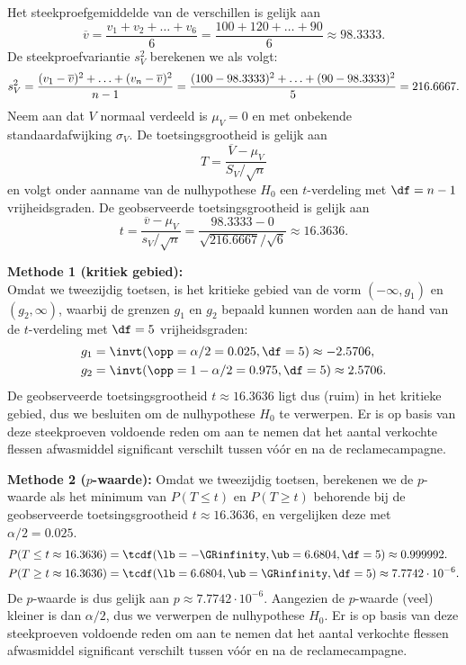 {    Het steekproefgemiddelde van de verschillen is gelijk aan
    \[
        \overline{v} = \frac{v_1 + v_2 + \ldots + v_6}{6} = \frac{100 + 120 + \ldots + 90}{6} \approx 98.3333.
    \]
    De steekproefvariantie $s_V^2$ berekenen we als volgt:
    \[
        s_V^2 = \frac{(v_1-\overline{v})^2 + \ldots + (v_n-\overline{v})^2}{n-1} = \frac{(100-98.3333)^2 + \ldots + (90-98.3333)^2}{5} = 216.6667. \\
    \]
    Neem aan dat $V$ normaal verdeeld is $\mu_V = 0$ en met onbekende standaardafwijking $\sigma_V$.
    De toetsingsgrootheid is gelijk aan
    \[
        T = \frac{\overline{V} - \mu_V}{S_V / \sqrt{n}}
    \]
    en volgt onder aanname van de nulhypothese $H_0$ een $t$-verdeling met $\df=n-1$ vrijheidsgraden.
    De geobserveerde toetsingsgrootheid is gelijk aan
    \[
        t = \frac{\overline{v} - \mu_V}{s_V / \sqrt{n}} = \frac{98.3333 - 0}{\sqrt{216.6667} / \sqrt{6}} \approx 16.3636.
    \]

    {\noindent\bfseries Methode 1 (kritiek gebied):}\\
    Omdat we tweezijdig toetsen, is het kritieke gebied van de vorm $(-\infty, g_1)$ en $(g_2, \infty)$, waarbij de grenzen $g_1$ en $g_2$ bepaald 
    kunnen worden aan de hand van de $t$-verdeling met $\df=5$ vrijheidsgraden:
    \begin{align*}
        g_1 &= \invt(\opp=\alpha/2 = 0.025, \df=5) \approx -2.5706, \\
        g_2 &= \invt(\opp=1-\alpha/2 = 0.975, \df=5) \approx 2.5706.
    \end{align*}
    De geobserveerde toetsingsgrootheid $t \approx 16.3636$ ligt dus (ruim) in het kritieke gebied, dus we besluiten om de nulhypothese $H_0$ te verwerpen.
    Er is op basis van deze steekproeven voldoende reden om aan te nemen dat het aantal verkochte flessen afwasmiddel significant verschilt tussen vóór en
    na de reclamecampagne.\\
    \medskip

    {\noindent\bfseries Methode 2 ($p$-waarde):}
    Omdat we tweezijdig toetsen, berekenen we de $p$-waarde als het minimum van $P(T \leq t)$ en $P(T \geq t)$ behorende bij de geobserveerde toetsingsgrootheid $t \approx 16.3636$, en vergelijken deze met $\alpha/2 = 0.025$.
    \begin{align*}
        P(T \leq t \approx 16.3636) &= \tcdf(\lb=-\GRinfinity, \ub=6.6804, \df=5) \approx 0.999992.\\
        P(T \geq t \approx 16.3636) &= \tcdf(\lb=6.6804, \ub=\GRinfinity, \df=5) \approx 7.7742 \cdot 10^{-6}.
    \end{align*}
    De $p$-waarde is dus gelijk aan $p \approx 7.7742 \cdot 10^{-6}$.
    Aangezien de $p$-waarde (veel) kleiner is dan $\alpha/2$, dus we verwerpen de nulhypothese $H_0$.
    Er is op basis van deze steekproeven voldoende reden om aan te nemen dat het aantal verkochte flessen afwasmiddel significant verschilt tussen vóór en 
    na de reclamecampagne.
}